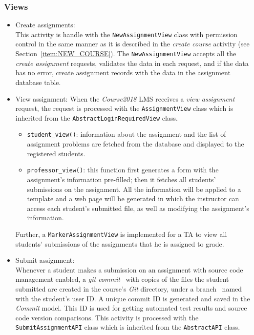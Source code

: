 \subsubsection{Views}
\begin{itemize}
    \item Create assignments: \\
        This activity is handle with the \texttt{NewAssignmentView} class with 
        permission control in the same manner as it is described in the
        \emph{create course} activity (see Section~\ref{item:NEW_COURSE}).
        The \texttt{NewAssignmentView} accepts all the \emph{create assignment}
        requests, validates the data in each request, and if the data has no
        error, create assignment records with the data in the assignment
        database table.

    \item View assignment:
        When the \emph{Course2018} LMS receives a \emph{view assignment}
        request, the request is processed with the \texttt{AssignmentView}
        class which is inherited from the \texttt{AbstractLoginRequiredView}
        class.
        \begin{itemize}
            \item \texttt{student\_view()}:
                information about the assignment and the list of assignment
                problems are fetched from the database and displayed to the 
                registered students.
            \item \texttt{professor\_view()}:
            \label{item:PROF_VIEW}
                this function first generates a form with the assignment's
                information pre-filled; then it fetches all students'
                submissions on the assignment. All the information will
                be applied to a template and a web page will be generated in
                which the instructor can access each student's submitted file,
                as well as modifying the assignment's information.
        \end{itemize}

        Further, a \texttt{MarkerAssignmentView} is implemented for a TA to
        view all students' submissions of the assignments that he is assigned to
        grade.

    \item Submit assignment: \\
        Whenever a student makes a submission on an assignment with source
        code management enabled, 
        a \emph{git commit}~\citep[Chapter 2]{progit} with copies of the files
        the student submitted are created in the course's \emph{Git} directory,
        under a branch~\cite[Chapter 3]{progit} named with the student's user
        ID.
        A unique commit ID is generated and saved in the \emph{Commit} model.
        This ID is used for getting automated test results and
        source code version comparisons.
        This activity is processed with the \texttt{SubmitAssignmentAPI} class
        which is inherited from the \texttt{AbstractAPI} class.
\end{itemize}

